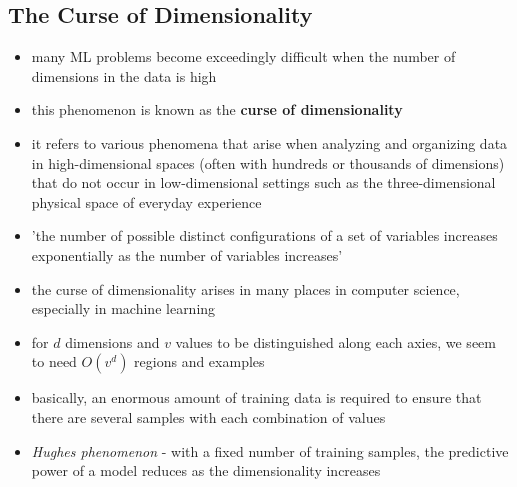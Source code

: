 \documentclass[11pt, twocolumn]{report}
\begin{document}
\subsection{The Curse of Dimensionality}
\begin{itemize}
  \item many ML problems become exceedingly difficult when the number of
    dimensions in the data is high
  \item this phenomenon is known as the \textbf{curse of dimensionality}
  \item it refers to various phenomena that arise when analyzing and organizing
    data in high-dimensional spaces (often with hundreds or thousands of
    dimensions) that do not occur in low-dimensional settings such as the
    three-dimensional physical space of everyday experience
  \item 'the number of possible distinct configurations of a set of variables
    increases exponentially as the number of variables increases'
  \item the curse of dimensionality arises in many places in computer science,
    especially in machine learning
  \item for $d$ dimensions and $v$ values to be distinguished along each axies,
    we seem to need $O(v^d)$ regions and examples
  \item basically, an enormous amount of training data is required to ensure
    that there are several samples with each combination of values
  \item \textit{Hughes phenomenon} - with a fixed number of training samples,
    the predictive power of a model reduces as the dimensionality increases
\end{itemize}
\end{document}
